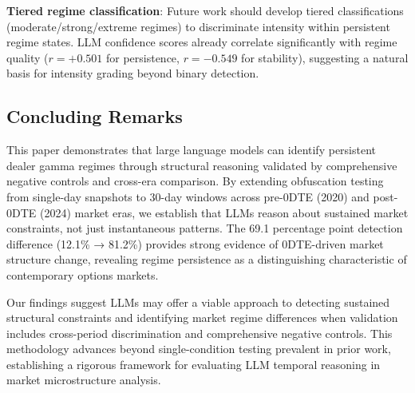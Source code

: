 \textbf{Tiered regime classification}: Future work should develop tiered classifications (moderate/strong/extreme regimes) to discriminate intensity within persistent regime states. LLM confidence scores already correlate significantly with regime quality ($r = +0.501$ for persistence, $r = -0.549$ for stability), suggesting a natural basis for intensity grading beyond binary detection.

\subsection{Concluding Remarks}

This paper demonstrates that large language models can identify persistent dealer gamma regimes through structural reasoning validated by comprehensive negative controls and cross-era comparison. By extending obfuscation testing from single-day snapshots to 30-day windows across pre-0DTE (2020) and post-0DTE (2024) market eras, we establish that LLMs reason about sustained market constraints, not just instantaneous patterns. The 69.1 percentage point detection difference (12.1\% → 81.2\%) provides strong evidence of 0DTE-driven market structure change, revealing regime persistence as a distinguishing characteristic of contemporary options markets.

Our findings suggest LLMs may offer a viable approach to detecting sustained structural constraints and identifying market regime differences when validation includes cross-period discrimination and comprehensive negative controls. This methodology advances beyond single-condition testing prevalent in prior work, establishing a rigorous framework for evaluating LLM temporal reasoning in market microstructure analysis.
